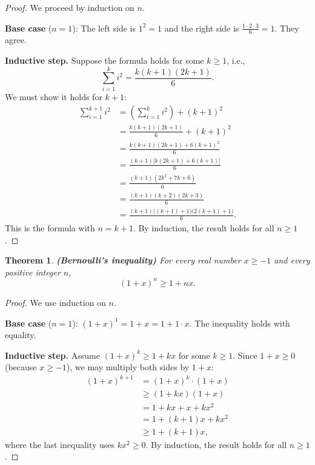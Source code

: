 \documentclass[12pt,a4paper,openany]{book}
\theoremstyle{definition}
\theoremstyle{plain}
\newtheorem{theorem}[definition]{Theorem}
\theoremstyle{remark}
\begin{document}
\begin{proof}
We proceed by induction on $n$.

\medskip\noindent
\textbf{Base case} ($n = 1$): The left side is $1^2 = 1$ and the right side is
$\frac{1 \cdot 2 \cdot 3}{6} = 1$. They agree.

\medskip\noindent
\textbf{Inductive step.} Suppose the formula holds for some $k \geq 1$, i.e.,
\[
  \sum_{i=1}^{k} i^2 = \frac{k(k+1)(2k+1)}{6}.
  \tag{Inductive Hypothesis}
\]
We must show it holds for $k + 1$:
\begin{align*}
  \sum_{i=1}^{k+1} i^2
  &= \left(\sum_{i=1}^{k} i^2\right) + (k+1)^2 \\
  &= \frac{k(k+1)(2k+1)}{6} + (k+1)^2 \\
  &= \frac{k(k+1)(2k+1) + 6(k+1)^2}{6} \\
  &= \frac{(k+1)\bigl[k(2k+1) + 6(k+1)\bigr]}{6} \\
  &= \frac{(k+1)(2k^2 + 7k + 6)}{6} \\
  &= \frac{(k+1)(k+2)(2k+3)}{6} \\
  &= \frac{(k+1)\bigl((k+1)+1\bigr)\bigl(2(k+1)+1\bigr)}{6}.
\end{align*}
This is the formula with $n = k + 1$. By induction, the result holds for all
$n \geq 1$.
\end{proof}

\begin{theorem}
\label{thm:bernoulli}
\textbf{(Bernoulli's inequality)}
For every real number $x \geq -1$ and every positive integer $n$,
\[
  (1 + x)^n \geq 1 + nx.
\]
\end{theorem}

\begin{proof}
We use induction on $n$.

\medskip\noindent
\textbf{Base case} ($n = 1$): $(1+x)^1 = 1 + x = 1 + 1 \cdot x$. The inequality
holds with equality.

\medskip\noindent
\textbf{Inductive step.} Assume $(1+x)^k \geq 1 + kx$ for some $k \geq 1$.
Since $1 + x \geq 0$ (because $x \geq -1$), we may multiply both sides by $1 + x$:
\begin{align*}
  (1+x)^{k+1} &= (1+x)^k \cdot (1+x) \\
               &\geq (1 + kx)(1 + x) \\
               &= 1 + kx + x + kx^2 \\
               &= 1 + (k+1)x + kx^2 \\
               &\geq 1 + (k+1)x,
\end{align*}
where the last inequality uses $kx^2 \geq 0$. By induction, the result holds for
all $n \geq 1$.
\end{proof}
\end{document}
